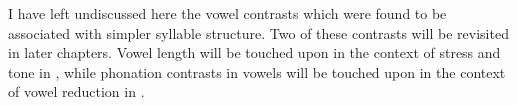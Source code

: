   I have left undiscussed here the vowel contrasts which were found to be associated with simpler syllable structure. Two of these contrasts will be revisited in later chapters. Vowel length will be touched upon in the context of stress and tone in , while phonation contrasts in vowels will be touched upon in the context of vowel reduction in .

